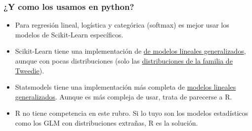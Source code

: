 \documentclass{beamer}
\begin{document}
\begin{frame}
  \frametitle{¿Y como los usamos en python?}

  \begin{itemize}
    \item Para regresión lineal, logística y categórica (softmax) es mejor usar los modelos de Scikit-Learn específicos.
    \item Scikit-Learn tiene una implementación de \href{https://scikit-learn.org/stable/modules/linear_model.html\#generalized-linear-models}{de modelos lineales generalizados}, aunque con pocas distribuciones (solo las \href{https://en.wikipedia.org/wiki/Tweedie_distribution}{distribuciones de la familia de Tweedie}).
    \item Statsmodels tiene una implementación más completa de \href{https://www.statsmodels.org/stable/glm.html}{modelos lineales generalizados}. Aunque es más compleja de usar, trata de parecerse a R.
    \item R no tiene competencia en este rubro. Si lo tuyo son los modelos estadísticos como los GLM con distribuciones extrañas, R es la solución.
  \end{itemize}
\end{frame}
\end{document}
